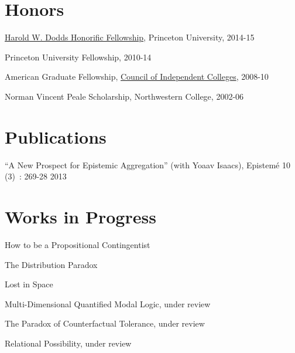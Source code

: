 \documentclass{cv_07152020}
\begin{document}
\section*{Honors}
\medskip
\begin{etaremune}
	\item[] \href{https://gradschool.princeton.edu/costs-funding/sources-funding/fellowships/competitive}{Harold W. Dodds Honorific Fellowship}, Princeton University, 2014-15
	\item[] Princeton University Fellowship, 2010-14
	\item[] American Graduate Fellowship, \href{https://www.cic.edu}{Council of Independent Colleges}, 2008-10	
	\item[] Norman Vincent Peale Scholarship, Northwestern College, 2002-06
\end{etaremune}


\section*{Publications}
\medskip
\begin{etaremune}
\item ``A New Prospect for Epistemic Aggregation'' (with Yoaav Isaacs), Epistemé 10 \mbox{(3) :} 269-28 2013
\end{etaremune}

		
\section*{Works in Progress}
\medskip
\begin{etaremune}
	\item How to be a Propositional Contingentist
	\item The Distribution Paradox
	\item Lost in Space
	\item Multi-Dimensional Quantified Modal Logic, under review
	\item The Paradox of Counterfactual Tolerance, under review
	\item Relational Possibility, under review
\end{etaremune}
	


		
\end{document}

